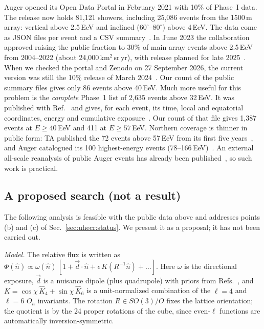 Auger opened its Open Data Portal in February 2021 with 10\% of Phase~I data.
The release now holds 81{,}121 showers, including 25{,}086 events from the
1500\,m array: vertical above 2.5\,EeV and inclined ($60^\circ$--$80^\circ$)
above 4\,EeV. The data come as JSON files per event and a CSV
summary~\cite{PierreAuger2025pierre,PierreAuger2024pierre}. In June 2023 the
collaboration approved raising the public fraction to 30\% of main-array events
above 2.5\,EeV from 2004--2022 (about 24{,}000\,km$^2$\,sr\,yr), with release
planned for late 2025~\cite{PierreAuger2025expanding}. When we checked the
portal and Zenodo on 27 September 2026, the current version was still the 10\%
release of March 2024~\cite{PierreAuger2024pierre}. Our count of the public
summary files gives only 86 events above 40\,EeV. Much more useful for this
problem is the \emph{complete} Phase~1 list of 2{,}635 events above 32\,EeV. It
was published with Ref.~\cite{PierreAuger2022arrival} and gives, for each event,
its time, local and equatorial coordinates, energy and cumulative
exposure~\cite{PierreAuger2022material}. Our count of that file gives 1{,}387
events at $E\geq40$\,EeV and 411 at $E\geq57$\,EeV. Northern coverage is thinner
in public form: TA published the 72 events above 57\,EeV from its first five
years~\cite{TelescopeArray2014indications}, and Auger catalogued its 100
highest-energy events (78--166\,EeV)~\cite{PierreAuger2023catalog}. An external
all-scale reanalysis of public Auger events has already been
published~\cite{Ahlers2018searching}, so such work is practical.

\subsection{A proposed search (not a result)}
\label{sec:uhecr:proposal}

The following analysis is feasible with the public data above and addresses
points (b) and (c) of Sec.~\ref{sec:uhecr:status}. We present it as a proposal;
it has not been carried out.

\emph{Model.} The relative flux is written as
$\Phi(\hat n)\propto\omega(\hat n)\,[1+\vec d\cdot\hat n+\epsilon\,
K(R^{-1}\hat n)+\dots]$. Here $\omega$ is the directional exposure, $\vec d$ is a
nuisance dipole (plus quadrupole) with priors from
Refs.~\cite{PierreAuger2024large,PierreAuger2017observation}, and
$K=\cos\chi\,\hat K_4+\sin\chi\,\hat K_6$ is a unit-normalized combination of
the $\ell=4$ and $\ell=6$ $O_h$ invariants. The rotation $R\in SO(3)/O$ fixes
the lattice orientation; the quotient is by the 24 proper rotations of the
cube, since even-$\ell$ functions are automatically inversion-symmetric.

